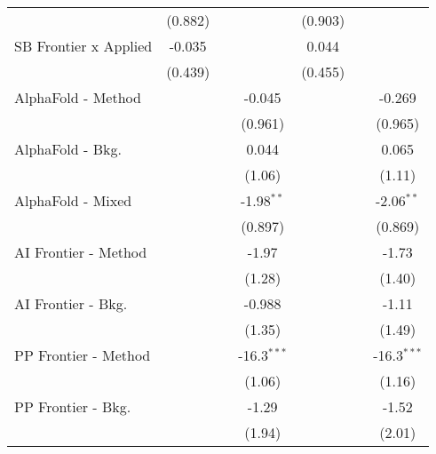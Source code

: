 \begin{tabular}{lcccccc}
                                & (0.882)       &         &               & (0.903)       &         &   \\   
   SB Frontier x Applied        & -0.035        &         &               & 0.044         &         &   \\   
                                & (0.439)       &         &               & (0.455)       &         &   \\   
   AlphaFold - Method           &               &         & -0.045        &               &         & -0.269\\   
                                &               &         & (0.961)       &               &         & (0.965)\\   
   AlphaFold - Bkg.             &               &         & 0.044         &               &         & 0.065\\   
                                &               &         & (1.06)        &               &         & (1.11)\\   
   AlphaFold - Mixed            &               &         & -1.98$^{**}$  &               &         & -2.06$^{**}$\\   
                                &               &         & (0.897)       &               &         & (0.869)\\   
   AI Frontier - Method         &               &         & -1.97         &               &         & -1.73\\   
                                &               &         & (1.28)        &               &         & (1.40)\\   
   AI Frontier - Bkg.           &               &         & -0.988        &               &         & -1.11\\   
                                &               &         & (1.35)        &               &         & (1.49)\\   
   PP Frontier - Method         &               &         & -16.3$^{***}$ &               &         & -16.3$^{***}$\\   
                                &               &         & (1.06)        &               &         & (1.16)\\   
   PP Frontier - Bkg.           &               &         & -1.29         &               &         & -1.52\\   
                                &               &         & (1.94)        &               &         & (2.01)\\   

\end{tabular}
